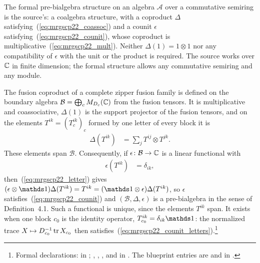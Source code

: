 \documentclass{article}
\begin{document}
The formal pre-bialgebra structure on an algebra $\mathcal A$ over a
commutative semiring is the source's: a coalgebra structure, with a
coproduct $\Delta$ satisfying~(\ref{eq:mrgscp22_coassoc}) and a counit
$\epsilon$ satisfying~(\ref{eq:mrgscp22_counit}), whose coproduct is
multiplicative~(\ref{eq:mrgscp22_mult}).  Neither $\Delta(1)=1\otimes1$ nor
any compatibility of $\epsilon$ with the unit or the product is required.
The source works over $\mathbb{C}$ in finite dimension; the formal structure allows
any commutative semiring and any module.

The fusion coproduct of a complete zipper fusion family is defined on the
boundary algebra $\mathcal B=\bigoplus_cM_{D_c}(\mathbb{C})$ from the fusion
tensors.  It is multiplicative and coassociative, $\Delta(1)$ is the support
projector of the fusion tensors, and on the elements
$T^{ik}=(T_c^{ik})_c$ formed by one letter of every block it is
\begin{align}
    \Delta(T^{ik})
     & =\sum_jT^{ij}\otimes T^{jk}.
    \label{eq:mrgscp22_letter}
\end{align}
These elements span $\mathcal B$.  Consequently, if
$\epsilon\colon\mathcal B\to\mathbb{C}$ is a linear functional with
\begin{align}
    \epsilon(T^{ik})
     & =\delta_{ik},
    \label{eq:mrgscp22_counit_letters}
\end{align}
then~(\ref{eq:mrgscp22_letter}) gives
$(\epsilon\otimes\Id)\Delta(T^{ik})=T^{ik}=(\Id\otimes\epsilon)\Delta(T^{ik})$,
so $\epsilon$ satisfies~(\ref{eq:mrgscp22_counit}) and
$(\mathcal B,\Delta,\epsilon)$ is a pre-bialgebra in the sense of
Definition~4.1.  Such a functional is unique, since the elements $T^{ik}$
span.  It exists when one block $c_0$ is the identity operator,
$T_{c_0}^{ik}=\delta_{ik}\Id$: the normalized trace
$X\mapsto D_{c_0}^{-1}\operatorname{tr} X_{c_0}$ then
satisfies~(\ref{eq:mrgscp22_counit_letters}).\footnote{Formal declarations:
     in ;
    ,
    ,
    ,
    and  in
    .  The blueprint
    entries are  and
     in
    .}
\end{document}
